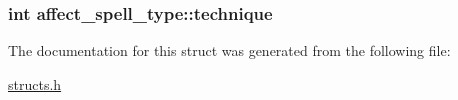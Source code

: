 \hypertarget{structaffect__spell__type_a406584bf2087e984ce3082256fefed04}{
\subsubsection[{technique}]{\setlength{\rightskip}{0pt plus 5cm}int affect\-\_\-spell\-\_\-type\-::technique}}\label{structaffect__spell__type_a406584bf2087e984ce3082256fefed04}


The documentation for this struct was generated from the following file\-:\begin{DoxyCompactItemize}
\item 
\hyperlink{structs_8h}{structs.\-h}\end{DoxyCompactItemize}
